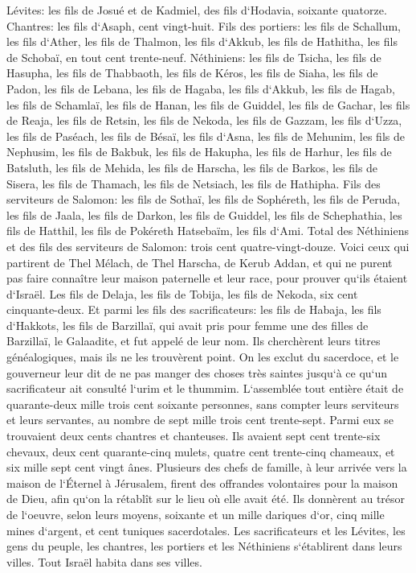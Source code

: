 \verse Lévites: les fils de Josué et de Kadmiel, des fils d`Hodavia, soixante quatorze. 
\verse Chantres: les fils d`Asaph, cent vingt-huit. 
\verse Fils des portiers: les fils de Schallum, les fils d`Ather, les fils de Thalmon, les fils d`Akkub, les fils de Hathitha, les fils de Schobaï, en tout cent trente-neuf. 
\verse Néthiniens: les fils de Tsicha, les fils de Hasupha, les fils de Thabbaoth, 
\verse les fils de Kéros, les fils de Siaha, les fils de Padon, 
\verse les fils de Lebana, les fils de Hagaba, les fils d`Akkub, 
\verse les fils de Hagab, les fils de Schamlaï, les fils de Hanan, 
\verse les fils de Guiddel, les fils de Gachar, les fils de Reaja, 
\verse les fils de Retsin, les fils de Nekoda, les fils de Gazzam, 
\verse les fils d`Uzza, les fils de Paséach, les fils de Bésaï, 
\verse les fils d`Asna, les fils de Mehunim, les fils de Nephusim, 
\verse les fils de Bakbuk, les fils de Hakupha, les fils de Harhur, 
\verse les fils de Batsluth, les fils de Mehida, les fils de Harscha, 
\verse les fils de Barkos, les fils de Sisera, les fils de Thamach, 
\verse les fils de Netsiach, les fils de Hathipha. 
\verse Fils des serviteurs de Salomon: les fils de Sothaï, les fils de Sophéreth, les fils de Peruda, 
\verse les fils de Jaala, les fils de Darkon, les fils de Guiddel, 
\verse les fils de Schephathia, les fils de Hatthil, les fils de Pokéreth Hatsebaïm, les fils d`Ami. 
\verse Total des Néthiniens et des fils des serviteurs de Salomon: trois cent quatre-vingt-douze. 
\verse Voici ceux qui partirent de Thel Mélach, de Thel Harscha, de Kerub Addan, et qui ne purent pas faire connaître leur maison paternelle et leur race, pour prouver qu`ils étaient d`Israël. 
\verse Les fils de Delaja, les fils de Tobija, les fils de Nekoda, six cent cinquante-deux. 
\verse Et parmi les fils des sacrificateurs: les fils de Habaja, les fils d`Hakkots, les fils de Barzillaï, qui avait pris pour femme une des filles de Barzillaï, le Galaadite, et fut appelé de leur nom. 
\verse Ils cherchèrent leurs titres généalogiques, mais ils ne les trouvèrent point. On les exclut du sacerdoce, 
\verse et le gouverneur leur dit de ne pas manger des choses très saintes jusqu`à ce qu`un sacrificateur ait consulté l`urim et le thummim. 
\verse L`assemblée tout entière était de quarante-deux mille trois cent soixante personnes, 
\verse sans compter leurs serviteurs et leurs servantes, au nombre de sept mille trois cent trente-sept. Parmi eux se trouvaient deux cents chantres et chanteuses. 
\verse Ils avaient sept cent trente-six chevaux, deux cent quarante-cinq mulets, 
\verse quatre cent trente-cinq chameaux, et six mille sept cent vingt ânes. 
\verse Plusieurs des chefs de famille, à leur arrivée vers la maison de l`Éternel à Jérusalem, firent des offrandes volontaires pour la maison de Dieu, afin qu`on la rétablît sur le lieu où elle avait été. 
\verse Ils donnèrent au trésor de l`oeuvre, selon leurs moyens, soixante et un mille dariques d`or, cinq mille mines d`argent, et cent tuniques sacerdotales. 
\verse Les sacrificateurs et les Lévites, les gens du peuple, les chantres, les portiers et les Néthiniens s`établirent dans leurs villes. Tout Israël habita dans ses villes. 

